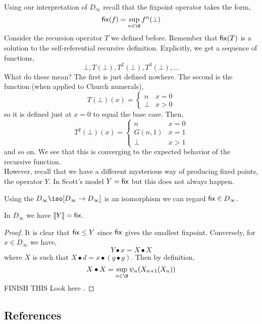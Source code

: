 \documentclass[12pt]{article}
\newcommand{\br}[1]{\llbracket #1 \rrbracket}
\begin{document}
Using our interpretation of $D_{\infty}$ recall that the fixpoint operator takes the form,
\[ \fix(f) = \sup_{n \in \N} f^n(\bot) \]
Consider the recursion operator $T$ we defined before. Remember that $\mathsf{fix}(T)$ is a solution to the self-referential recursive definition. Explicitly, we get a sequence of functions,
\[ \bot, T(\bot), T^2(\bot), T^3(\bot), \dots \]
What do these mean? The first is just defined nowhere. The second is the function (when applied to Church numerals),
\[ T(\bot)(x) = \begin{cases}
n & x = 0
\\
\bot & x > 0
\end{cases} \]
so it is defined just at $x = 0$ to equal the base case. Then,
\[  T^2(\bot)(x) = 
\begin{cases}
n & x = 0
\\
G(n, 1) & x = 1
\\
\bot & x > 1
\end{cases}
\]
and so on. We see that this is converging to the expected behavior of the recursive function. 
\bigskip\\
However, recall that we have a different mysterious way of producing fixed points, the operator $Y$. In Scott's model $Y = \mathsf{fix}$ but this does not always happen.

\begin{rmk}
Using the $D_{\infty} \iso [D_{\infty} \to D_{\infty}]$ is an isomorphism we can regard $\mathsf{fix} \in D_{\infty}$. 
\end{rmk}

\begin{prop}
In $D_{\infty}$ we have $\br{Y} = \fix$.
\end{prop}

\begin{proof}
It is clear that $\mathsf{fix} \le Y$ since $\mathsf{fix}$ gives the smallest fixpoint. Conversely, for $x \in D_{\infty}$ we have,
\[ Y \bullet x = X \bullet X \]
where $X$ is such that $X \bullet d = x \bullet (y \bullet y)$. Then by definition,
\[ X \bullet X = \sup_{n \in \N} \psi_n(X_{n+1}(X_n)) \]
{\color{red} FINISH THIS}
Look here .
\end{proof}

\subsection{References}
\end{document}
